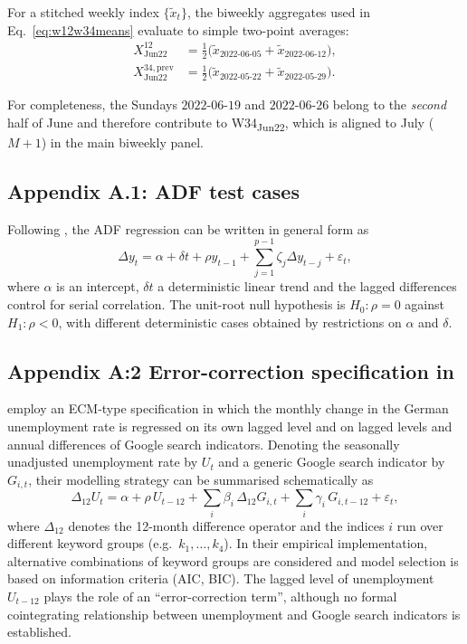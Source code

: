 \documentclass[12pt,a4paper]{article}
\begin{document}
For a stitched weekly index $\{\tilde{x}_{t}\}$, the biweekly aggregates used in Eq.~\eqref{eq:w12w34means} evaluate to simple two-point averages:
\begin{align*}
X^{12}_{\text{Jun22}}
&=
\frac{1}{2}\Big(\tilde{x}_{\text{2022-06-05}}+\tilde{x}_{\text{2022-06-12}}\Big),\\
X^{34,\text{prev}}_{\text{Jun22}}
&=
\frac{1}{2}\Big(\tilde{x}_{\text{2022-05-22}}+\tilde{x}_{\text{2022-05-29}}\Big).
\end{align*}

\noindent
For completeness, the Sundays $\text{2022-06-19}$ and $\text{2022-06-26}$ belong to the \emph{second} half of June and therefore contribute to W34\textsubscript{Jun22}, which is aligned to July ($M{+}1$) in the main biweekly panel.






\subsection*{Appendix A.1: ADF test cases}
\label{app:adf_cases}
Following \citet[Table~17.3]{hamilton}, the ADF regression can be written in general form as
\begin{equation}
\Delta y_t
=
\alpha + \delta t + \rho y_{t-1}
+ \sum_{j=1}^{p-1} \zeta_j \Delta y_{t-j}
+ \varepsilon_t,
\end{equation}
where $\alpha$ is an intercept, $\delta t$ a deterministic linear trend and the lagged differences control for serial correlation. The unit-root null hypothesis is $H_0\!:\rho = 0$ against $H_1\!:\rho < 0$, with different deterministic cases obtained by restrictions on $\alpha$ and $\delta$.

\subsection{Appendix A:2 Error-correction specification in \citet{Askitas}}
\label{app:az_ecm}

\citet{Askitas} employ an ECM-type specification in which the monthly change in the German unemployment rate is regressed on its own lagged level and on lagged levels and annual differences of Google search indicators. Denoting the seasonally unadjusted unemployment rate by $U_t$ and a generic Google search indicator by $G_{i,t}$, their modelling strategy can be summarised schematically as
\begin{equation}
\Delta_{12} U_t
= \alpha
+ \rho\, U_{t-12}
+ \sum_i \beta_i \, \Delta_{12} G_{i,t}
+ \sum_i \gamma_i \, G_{i,t-12}
+ \varepsilon_t,
\end{equation}
where $\Delta_{12}$ denotes the 12-month difference operator and the indices $i$ run over different keyword groups (e.g.\ $k_1, \dots, k_4$). In their empirical implementation, alternative combinations of keyword groups are considered and model selection is based on information criteria (AIC, BIC). The lagged level of unemployment $U_{t-12}$ plays the role of an ``error-correction term'', although no formal cointegrating relationship between unemployment and Google search indicators is established.
\end{document}
